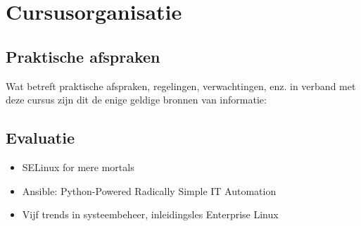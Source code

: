 \chapter{Cursusorganisatie}
\label{ch:cursusorganisatie}

\section{Praktische afspraken}
\label{sec:praktische-afspraken}

Wat betreft praktische afspraken, regelingen, verwachtingen, enz. in
verband met deze cursus zijn dit de enige geldige bronnen van
informatie:




\section{Evaluatie}
\label{sec:evaluatie}



\begin{itemize}
  \item SELinux for mere mortals~\autocite{Cameron2012}
  \item Ansible: Python-Powered Radically Simple IT Automation~\autocite{DeHaan2014}
  \item Vijf trends in systeembeheer, inleidingsles Enterprise Linux~\autocite{VanVreckem2013}
\end{itemize}

